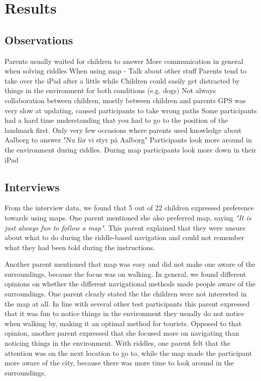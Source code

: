 \section{Results}

\subsection{Observations}
Parents usually waited for children to answer
More communication in general when solving riddles
When using map - Talk about other stuff
Parents tend to take over the iPad after a little while
Children could easily get distracted by things in the environment for both conditions (e.g. dogs)
Not always collaboration between children, mostly between children and parents
GPS was very slow at updating, caused participants to take wrong paths
Some participants had a hard time understanding that you had to go to the position of the landmark first.
Only very few occasions where parents used knowledge about Aalborg to answer
"Nu får vi styr på Aalborg"
Participants look more around in the environment during riddles. During map participants look more down in their iPad



\subsection{Interviews}
From the interview data, we found that 5 out of 22 children expressed preference towards using maps. One parent mentioned she also preferred map, saying \textit{"It is just always fun to follow a map"}. This parent explained that they were unsure about what to do during the riddle-based navigation and could not remember what they had been told during the instructions. 

Another parent mentioned that map was easy and did not make one aware of the surroundings, because the focus was on walking. In general, we found different opinions on whether the different navigational methods made people aware of the surroundings. One parent clearly stated the the children were not interested in the map at all. In line with several other test participants this parent expressed that it was fun to notice things in the environment they usually do not notice when walking by, making it an optimal method for tourists. Opposed to that opinion, another parent expressed that she focused more on navigating than noticing things in the environment. With riddles, one parent felt that the attention was on the next location to go to, while the map made the participant more aware of the city, because there was more time to look around in the surroundings. 

